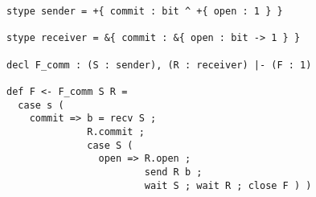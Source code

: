 \begin{lstlisting}[basicstyle=\small\ttfamily,frame=single]
stype sender = +{ commit : bit ^ +{ open : 1 } } 

stype receiver = &{ commit : &{ open : bit -> 1 } }

decl F_comm : (S : sender), (R : receiver) |- (F : 1)

def F <- F_comm S R =
  case s (
    commit => b = recv S ;
              R.commit ;
              case S (
                open => R.open ;
                        send R b ;
                        wait S ; wait R ; close F ) )
\end{lstlisting}
